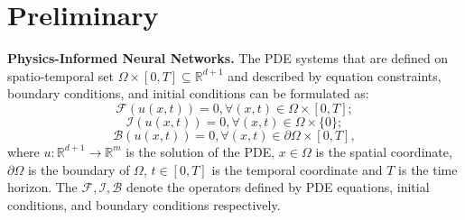 \documentclass{article}
\theoremstyle{plain}
\theoremstyle{definition}
\theoremstyle{remark}
\begin{document}
\section{Preliminary}


\textbf{Physics-Informed Neural Networks.}
The PDE systems that are defined on spatio-temporal set $\Omega \times [0,T] \subseteq  \mathbb R^{d+1}$ and described by equation constraints, boundary conditions, and initial conditions can be formulated as:
\vspace{-2mm}
\begin{equation}
    \mathcal F(u(x,t)) = 0,\forall (x,t)\in\Omega\times[0,T];
\end{equation}
\begin{equation}
    \mathcal I(u(x,t)) = 0,\forall (x,t)\in\Omega\times\{0\};
\end{equation}
\begin{equation}
    \mathcal B(u(x,t)) = 0,\forall (x,t)\in\partial\Omega\times [0,T],
\end{equation}
where $u:\mathbb R^{d+1}\rightarrow \mathbb R^m$ is the solution of the PDE, $x\in\Omega$ is the spatial coordinate, $\partial\Omega$ is the boundary of $\Omega$, $t \in [0,T]$ is the temporal coordinate and $T$ is the time horizon. The
$\mathcal F,\mathcal I, \mathcal B$ denote the operators defined by PDE equations, initial conditions, and boundary conditions respectively.
\end{document}
